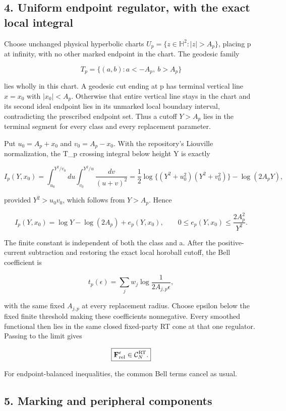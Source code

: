 \documentclass[11pt]{article}
\begin{document}
\subsection{4. Uniform endpoint regulator, with the exact local
integral}\label{uniform-endpoint-regulator-with-the-exact-local-integral}

Choose unchanged physical hyperbolic charts
\(U_p=\{z\in\mathbb H^2:|z|>A_p\}\), placing p at infinity, with no
other marked endpoint in the chart. The geodesic family

\[
T_p=\{(a,b):a<-A_p,\ b>A_p\}
\]

lies wholly in this chart. A geodesic cut ending at p has terminal
vertical line \(x=x_0\) with \(|x_0|<A_p\). Otherwise that entire
vertical line stays in the chart and its second ideal endpoint lies in
its unmarked local boundary interval, contradicting the prescribed
endpoint set. Thus a cutoff \(Y>A_p\) lies in the terminal segment for
every class and every replacement parameter.

Put \(u_0=A_p+x_0\) and \(v_0=A_p-x_0\). With the repository's Liouville
normalization, the T\_\allowbreak p crossing integral below height Y is exactly

\[
I_p(Y,x_0)
=\int_{u_0}^{Y^2/v_0}\!du\int_{v_0}^{Y^2/u}\!\frac{dv}{(u+v)^2}
=\frac12\log\{(Y^2+u_0^2)(Y^2+v_0^2)\}
-\log(2A_pY),
\]

provided \(Y^2>u_0v_0\), which follows from \(Y>A_p\). Hence

\[
I_p(Y,x_0)=\log Y-\log(2A_p)+e_p(Y,x_0),
\qquad 0\le e_p(Y,x_0)\le\frac{2A_p^2}{Y^2}.
\]

The finite constant is independent of both the class and a. After the
positive-current subtraction and restoring the exact local horoball
cutoff, the Bell coefficient is

\[
t_p(\epsilon)=\sum_jw_j\log\frac1{2A_{j,p}\epsilon},
\]

with the same fixed \(A_{j,p}\) at every replacement radius. Choose
epsilon below the fixed finite threshold making these coefficients
nonnegative. Every smoothed functional then lies in the same closed
fixed-party RT cone at that one regulator. Passing to the limit gives

\[
\boxed{\mathbf F_{\rm rel}^{\epsilon}\in\mathcal C_N^{\rm RT}.}
\]

For endpoint-balanced inequalities, the common Bell terms cancel as
usual.

\subsection{5. Marking and peripheral
components}\label{marking-and-peripheral-components}
\end{document}
